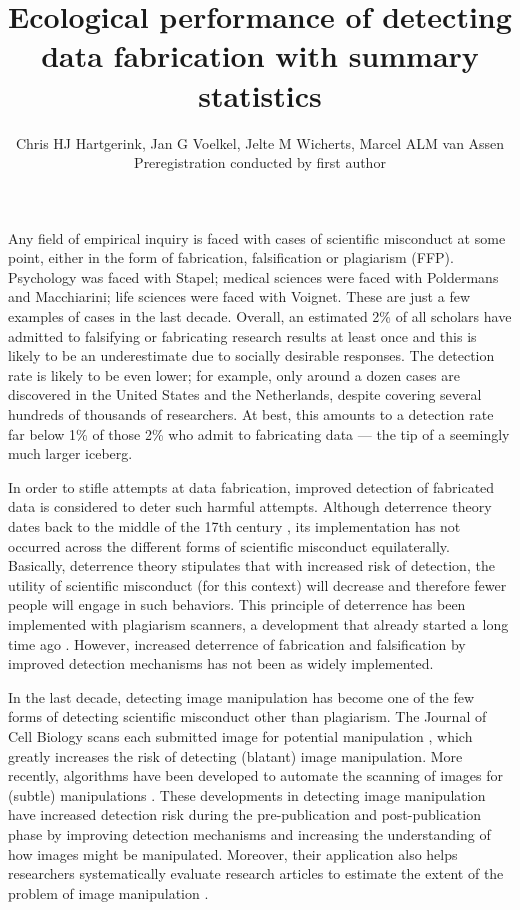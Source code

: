 \documentclass{article}
\title{Ecological performance of detecting data fabrication with summary statistics}
\author{Chris HJ Hartgerink, Jan G Voelkel, Jelte M Wicherts, Marcel ALM van Assen\\
Preregistration conducted by first author}
\begin{document}

\maketitle

Any field of empirical inquiry is faced with cases of scientific misconduct at some point, either in the form of fabrication, falsification or plagiarism (FFP). Psychology was faced with Stapel; medical sciences were faced with Poldermans and Macchiarini; life sciences were faced with Voignet. These are just a few examples of cases in the last decade. Overall, an estimated 2\% of all scholars have admitted to falsifying or fabricating research results at least once \citep{fanelli2009} and this is likely to be an underestimate due to socially desirable responses. The detection rate is likely to be even lower; for example, only around a dozen cases are discovered in the United States and the Netherlands, despite covering several hundreds of thousands of researchers. At best, this amounts to a detection rate far below 1\% of those 2\% who admit to fabricating data --- the tip of a seemingly much larger iceberg.

In order to stifle attempts at data fabrication, improved detection of fabricated data is considered to deter such harmful attempts. Although deterrence theory dates back to the middle of the 17th century \citep{leviathan}, its implementation has not occurred across the different forms of scientific misconduct equilaterally. Basically, deterrence theory stipulates that with increased risk of detection, the utility of scientific misconduct (for this context) will decrease and therefore fewer people will engage in such behaviors. This principle of deterrence has been implemented with plagiarism scanners, a development that already started a long time ago  \citep[e.g.,][]{Parker89computeralgorithms}. However, increased deterrence of fabrication and falsification by improved detection mechanisms has not been as widely implemented. 

In the last decade, detecting image manipulation has become one of the few forms of detecting scientific misconduct other than plagiarism. The Journal of Cell Biology scans each submitted image for potential manipulation \citep{The_Journal_of_Cell_Biology2015-vh}, which greatly increases the risk of detecting (blatant) image manipulation. More recently, algorithms have been developed to automate the scanning of images for (subtle) manipulations \citep{Koppers2016}. These developments in detecting image manipulation have increased detection risk during the pre-publication and post-publication phase by improving detection mechanisms and increasing the understanding of how images might be manipulated. Moreover, their application also helps researchers systematically evaluate research articles to estimate the extent of the problem of image manipulation \citep[4\% of all papers are estimated to contain manipulated images;][]{Bik06072016}. 
\end{document}
